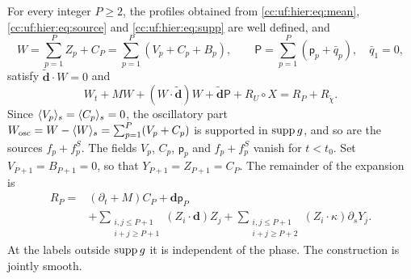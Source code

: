 \begin{proposition}\label{cc:uf:hier:prop:identity}
For every integer \(P\ge2\), the profiles obtained from
\eqref{cc:uf:hier:eq:mean}, \eqref{cc:uf:hier:eq:source} and
\eqref{cc:uf:hier:eq:supp} are well defined, and
\[
 W=\sum_{p=1}^PZ_p+C_P=\sum_{p=1}^P(V_p+C_p+B_p),\qquad
 \mathsf P=\sum_{p=1}^P(\mathsf p_p+\bar q_p),\quad \bar q_1=0,
\]
satisfy \(\widetilde {\mathbf d}\cdot W=0\) and
\begin{equation}\label{cc:uf:hier:eq:residual}
 W_t+MW+(W\cdot\widetilde {\mathbf d})W+\widetilde {\mathbf d}\mathsf P
       +R_U\circ X=R_P+R_{\widetilde\chi}.
\end{equation}
Since $\langle V_p\rangle_s=\langle C_p\rangle_s=0$, the oscillatory part
\(W_{\rm osc}=W-\langle W\rangle_s=\sum_{p=1}^P(V_p+C_p)\) is
supported in \(\operatorname{supp} g\), and so are the sources $f_p+f_p^S$.
The fields $V_p$, $C_p$, $\mathsf p_p$ and $f_p+f_p^S$ vanish for
$t<t_0$.
Set \(V_{P+1}=B_{P+1}=0\), so that \(Y_{P+1}=Z_{P+1}=C_P\). The
remainder of the expansion is
\begin{align}\label{cc:uf:hier:eq:tail}
 R_P={}&(\partial_t+M)C_P+\mathbf d\mathsf p_P\\
 &+\sum_{\substack{i,j\le P+1\\i+j\ge P+1}}
                  (Z_i\cdot \mathbf d)Z_j
 +\sum_{\substack{i,j\le P+1\\i+j\ge P+2}}
                  (Z_i\cdot\kappa)\partial_sY_j.\nonumber
\end{align}
At the labels outside $\operatorname{supp} g$ it is independent of the phase.
The construction is jointly smooth.
\end{proposition}
